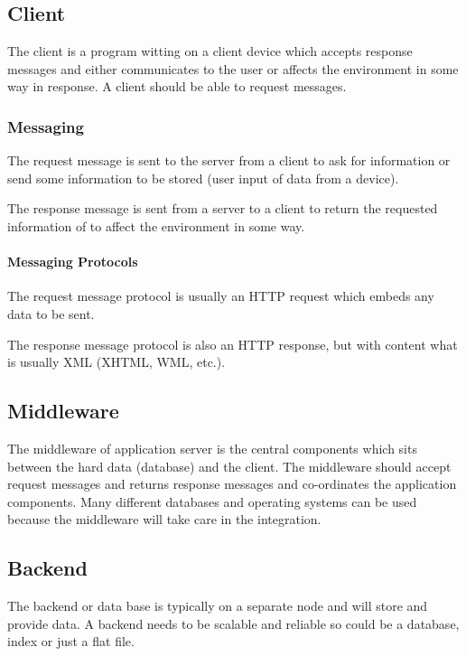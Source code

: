 \subsection{Client}\label{sub:client}

The client is a program witting on a client device which accepts response messages and either communicates to the user or affects the environment in some way in response.
A client should be able to request messages.

\subsubsection{Messaging}\label{ssub:messaging}

The request message is sent to the server from a client to ask for information or send some information to be stored (user input of data from a device).

The response message is sent from a server to a client to return the requested information of to affect the environment in some way.

\paragraph{Messaging Protocols}\label{par:messaging_protocols}

The request message protocol is usually an HTTP request which embeds any data to be sent.

The response message protocol is also an HTTP response, but with content what is usually XML (XHTML, WML, etc.).

\subsection{Middleware}\label{sub:middleware}

The middleware of application server is the central components which sits between the hard data (database) and the client.
The middleware should accept request messages and returns response messages and co-ordinates the application components.
Many different databases and operating systems can be used because the middleware will take care in the integration.

\subsection{Backend}\label{sub:backend}

The backend or data base is typically on a separate node and will store and provide data.
A backend needs to be scalable and reliable so could be a database, index or just a flat file.

